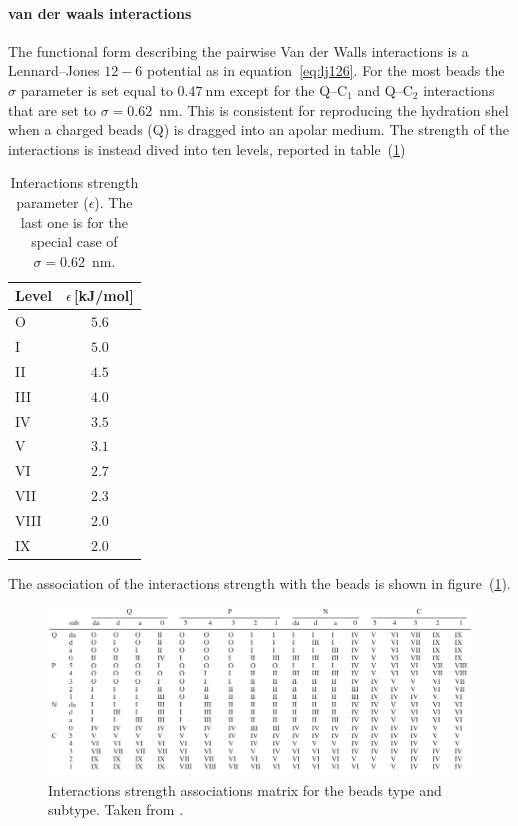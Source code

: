 \paragraph{\textbf{van der waals interactions}} The functional form describing the pairwise Van der Walls interactions is a Lennard--Jones $12-6$ potential as in equation~\eqref{eq:lj126}. 
For the most beads the $\sigma$ parameter is set equal to $0.47~$nm except for the Q--C$_1$ and Q--C$_2$ interactions that are set to $\sigma = 0.62$~nm. This is consistent for reproducing the hydration shel when a charged beads (Q) is dragged into an apolar medium. The strength of the interactions is instead dived into ten levels, reported in table~(\ref{tab:martiniEpsilon})
\begin{table}\footnotesize
\begin{tabular}{lc}
	\toprule
	Level  & $\epsilon$\,[kJ/mol] \\ \midrule
	O	   & $5.6$	 \\ \midrule
	I      & $5.0$	 \\ \midrule
	II	   & $4.5$	 \\ \midrule
	III	   & $4.0$	 \\ \midrule
	IV	   & $3.5$	 \\ \midrule
	V	   & $3.1$	 \\ \midrule
	VI	   & $2.7$	 \\ \midrule
	VII	   & $2.3$	 \\ \midrule
	VIII   & $2.0$	 \\ \midrule
	IX     & $2.0$	 \\ \bottomrule
\end{tabular}
\caption{Interactions strength parameter ($\epsilon$). The last one is for the special case of $\sigma=0.62$~nm.}
\label{tab:martiniEpsilon}
\end{table}
The association of the interactions strength with the \martini beads is shown in figure~(\ref{fig:martiniInteractions}).
\begin{figure}[!ht]
	\centering
	\includegraphics[width=1\textwidth]{img/martiniInteractions.pdf}
	\caption{Interactions strength associations matrix for the \martini beads type and subtype. Taken from \cite{Martini}.}
	\label{fig:martiniInteractions}
\end{figure}

